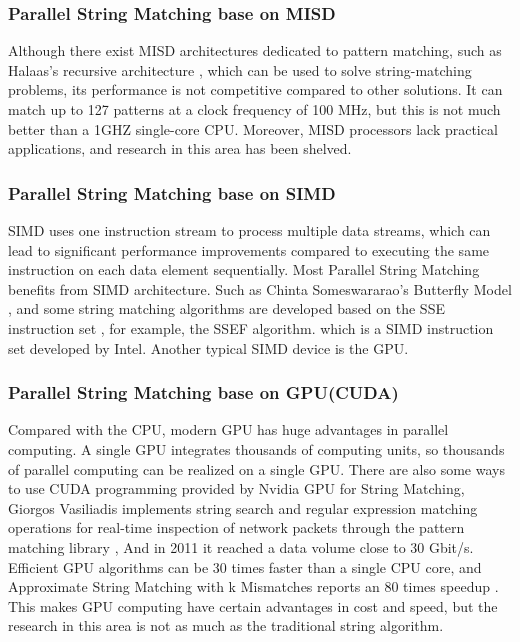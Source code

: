 \documentclass[11pt]{article}       %
\begin{document}
\subsubsection{Parallel String Matching base on MISD}
Although there exist MISD architectures dedicated to pattern matching, such as Halaas's recursive architecture \cite{MISD}, which can be used to solve string-matching problems, its performance is not competitive compared to other solutions. It can match up to 127 patterns at a clock frequency of 100 MHz, but this is not much better than a 1GHZ single-core CPU. Moreover, MISD processors lack practical applications, and research in this area has been shelved.


\subsubsection{Parallel String Matching base on SIMD}
SIMD uses one instruction stream to process multiple data streams, which can lead to significant performance improvements compared to executing the same instruction on each data element sequentially. Most Parallel String Matching benefits from SIMD architecture. Such as Chinta Someswararao's Butterfly Model \cite{Butterfly}, and some string matching algorithms are developed based on the SSE instruction set \cite{Matching}, for example, the SSEF algorithm. which is a SIMD instruction set developed by Intel. Another typical SIMD device is the GPU.

\subsubsection{Parallel String Matching base on GPU(CUDA)}
Compared with the CPU, modern GPU has huge advantages in parallel computing. A single GPU integrates thousands of computing units, so thousands of parallel computing can be realized on a single GPU. There are also some ways to use CUDA programming provided by Nvidia GPU for String Matching, Giorgos Vasiliadis implements string search and regular expression matching operations for real-time inspection of network packets through the pattern matching library \cite{Bit-Parallel}, And in 2011 it reached a data volume close to 30 Gbit/s. Efficient GPU algorithms can be 30 times faster than a single CPU core, and Approximate String Matching with k Mismatches reports an 80 times speedup \cite{pattern-matching}. This makes GPU computing have certain advantages in cost and speed, but the research in this area is not as much as the traditional string algorithm. 
\end{document}
